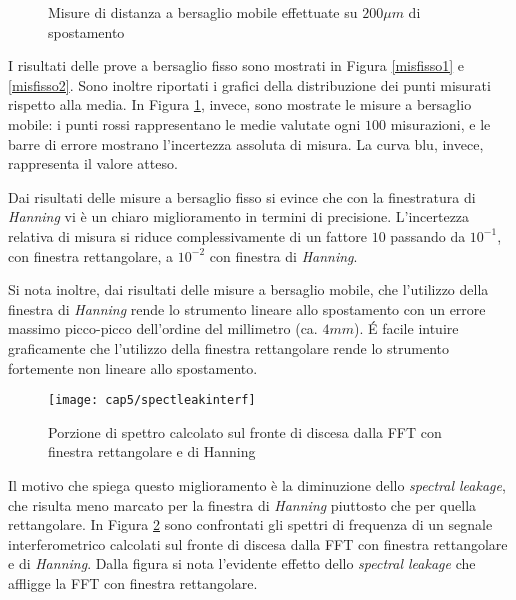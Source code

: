 \begin{figure}
\centering
{}
\hspace{5mm}
\caption{Misure di distanza a bersaglio mobile effettuate su $200 \mu m$ di spostamento}\label{mismobile12}
\end{figure}

I risultati delle prove a bersaglio fisso sono mostrati in Figura \ref{misfisso1} e \ref{misfisso2}. Sono inoltre riportati i grafici della distribuzione dei punti misurati rispetto alla media. In Figura \ref{mismobile12}, invece, sono mostrate le misure a bersaglio mobile: i punti rossi rappresentano le medie valutate ogni $100$ misurazioni, e le barre di errore mostrano l'incertezza assoluta di misura. La curva blu, invece, rappresenta il valore atteso.

Dai risultati delle misure a bersaglio fisso si evince che con la finestratura di \textit{Hanning} vi è un chiaro miglioramento in termini di precisione. L'incertezza relativa di misura si riduce complessivamente di un fattore $10$ passando da $10^{-1}$, con finestra rettangolare, a $10^{-2}$ con finestra di \textit{Hanning}.

Si nota inoltre, dai risultati delle misure a bersaglio mobile, che l'utilizzo della finestra di \textit{Hanning} rende lo strumento lineare allo spostamento con un errore massimo picco-picco dell'ordine del millimetro (ca. $4mm$). \'E facile intuire graficamente che l'utilizzo della finestra rettangolare rende lo strumento fortemente non lineare allo spostamento.
\begin{figure}  
  \begin{center}
    \texttt{[image: cap5/spectleakinterf]}
    \caption{Porzione di spettro calcolato sul fronte di discesa dalla FFT con finestra rettangolare e di Hanning}
    \label{spectleakinterf}
  \end{center}
\end{figure}

Il motivo che spiega questo miglioramento è la diminuzione dello \textit{spectral leakage}, che risulta meno marcato per la finestra di \textit{Hanning} piuttosto che per quella rettangolare. In Figura \ref{spectleakinterf} sono confrontati gli spettri di frequenza di un segnale interferometrico calcolati sul fronte di discesa dalla FFT con finestra rettangolare e di \textit{Hanning}. Dalla figura si nota l'evidente effetto dello \textit{spectral leakage} che affligge la FFT con finestra rettangolare.

